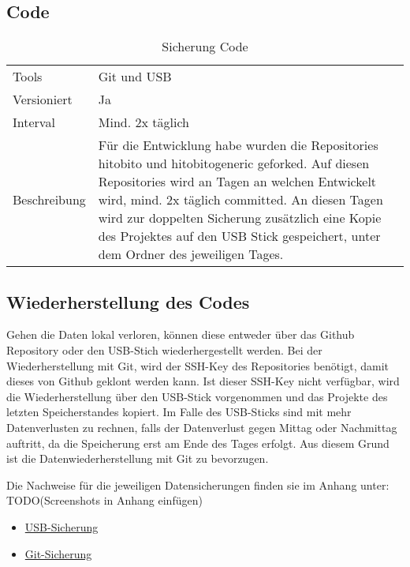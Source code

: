 \subsection{Code}
\begin{table}[h!]
    \begin{tabular}{|L{0.4\textwidth}|L{0.5\textwidth}|}
        \hline
          \\[12pt]
        \hline
        Tools & Git und USB \\
        \hline
        Versioniert & Ja \\
        \hline
        Interval & Mind. 2x täglich \\
        \hline
        Beschreibung & Für die Entwicklung habe wurden die Repositories hitobito und hitobito\-generic geforked.
        Auf diesen Repositories wird an Tagen an welchen Entwickelt wird, mind. 2x täglich committed. An diesen Tagen
        wird zur doppelten Sicherung zusätzlich eine Kopie des Projektes auf den USB Stick gespeichert, unter dem Ordner des jeweiligen Tages. \\
      \hline
      \end{tabular}
      \caption{Sicherung Code}
\end{table}

\subsection{Wiederherstellung des Codes}
Gehen die Daten lokal verloren, können diese entweder über das Github Repository oder den USB-Stich wiederhergestellt werden.
Bei der Wiederherstellung mit Git, wird der SSH-Key des Repositories benötigt, damit dieses von Github geklont werden kann. Ist
dieser SSH-Key nicht verfügbar, wird die Wiederherstellung über den USB-Stick vorgenommen und das Projekte des letzten Speicherstandes
kopiert. Im Falle des USB-Sticks sind mit mehr Datenverlusten zu rechnen, falls der Datenverlust gegen Mittag oder Nachmittag auftritt, da
die Speicherung erst am Ende des Tages erfolgt. Aus diesem Grund ist die Datenwiederherstellung mit Git zu bevorzugen.

Die Nachweise für die jeweiligen Datensicherungen finden sie im Anhang unter: TODO(Screenshots in Anhang einfügen)
\begin{itemize}
    \item \hyperref[sec:savusb]{USB-Sicherung}
    \item \hyperref[sec:savgit]{Git-Sicherung}
\end{itemize}

